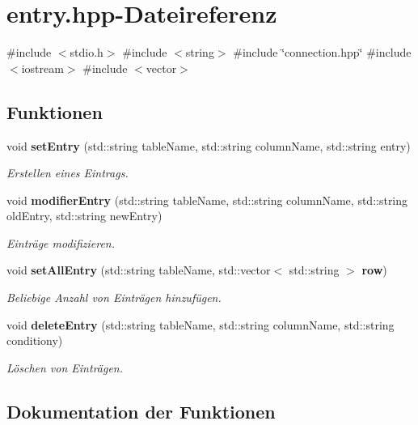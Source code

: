 \section{entry.\+hpp-\/\+Dateireferenz}
\label{entry_8hpp}
{\ttfamily \#include $<$stdio.\+h$>$}\newline
{\ttfamily \#include $<$string$>$}\newline
{\ttfamily \#include \char`\"{}connection.\+hpp\char`\"{}}\newline
{\ttfamily \#include $<$iostream$>$}\newline
{\ttfamily \#include $<$vector$>$}\newline
\subsection*{Funktionen}
\begin{DoxyCompactItemize}
\item 
void \textbf{ set\+Entry} (std\+::string table\+Name, std\+::string column\+Name, std\+::string entry)
\begin{DoxyCompactList}\small\item\em Erstellen eines Eintrags. \end{DoxyCompactList}\item 
void \textbf{ modifier\+Entry} (std\+::string table\+Name, std\+::string column\+Name, std\+::string old\+Entry, std\+::string new\+Entry)
\begin{DoxyCompactList}\small\item\em Einträge modifizieren. \end{DoxyCompactList}\item 
void \textbf{ set\+All\+Entry} (std\+::string table\+Name, std\+::vector$<$ std\+::string $>$ \textbf{ row})
\begin{DoxyCompactList}\small\item\em Beliebige Anzahl von Einträgen hinzufügen. \end{DoxyCompactList}\item 
void \textbf{ delete\+Entry} (std\+::string table\+Name, std\+::string column\+Name, std\+::string conditiony)
\begin{DoxyCompactList}\small\item\em Löschen von Einträgen. \end{DoxyCompactList}\end{DoxyCompactItemize}


\subsection{Dokumentation der Funktionen}
\mbox{\label{entry_8hpp_a490d3fdb8238137f5d9f4a1fecaf2f96}} 
